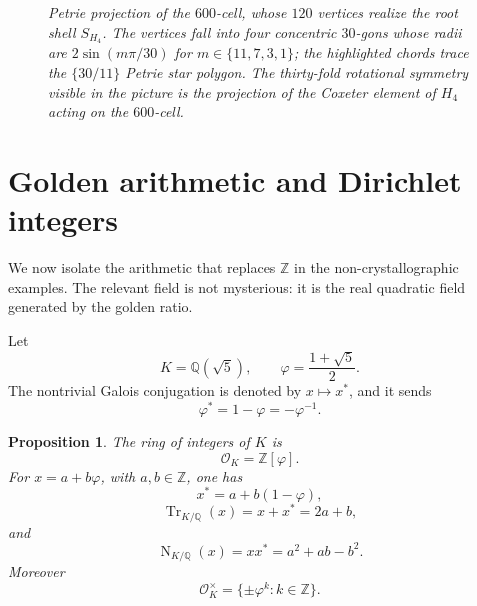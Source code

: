 \documentclass[12pt,oneside,english]{amsart}
\numberwithin{equation}{section}
\numberwithin{figure}{section}
\numberwithin{table}{section}
\theoremstyle{plain}
\newtheorem{proposition}[theorem]{Proposition}
\theoremstyle{definition}
\theoremstyle{remark}
\newcommand{\ZZ}{\mathbb Z}
\newcommand{\QQ}{\mathbb Q}
\newcommand{\KK}{\mathbb Q(\sqrt5)}
\newcommand{\Zphi}{\mathbb Z[\varphi]}
\newcommand{\Tr}{\operatorname{Tr}}
\newcommand{\Norm}{\operatorname{N}}
\begin{document}
\begin{figure}[htbp]
\caption{\emph{Petrie projection of the $600$-cell, whose $120$ vertices realize the root shell $S_{H_4}$. The vertices fall into four concentric $30$-gons whose radii are $2\sin(m\pi/30)$ for $m\in\{11,7,3,1\}$; the highlighted chords trace the $\{30/11\}$ Petrie star polygon. The thirty-fold rotational symmetry visible in the picture is the projection of the Coxeter element of $H_4$ acting on the $600$-cell.}}
\label{fig:600cell-petrie}
\end{figure}


\section{Golden arithmetic and Dirichlet integers}

We now isolate the arithmetic that replaces \(\ZZ\) in the non-crystallographic examples. The relevant field is not mysterious: it is the real quadratic field generated by the golden ratio.

Let
\begin{equation}
K=\KK,\qquad \varphi=\frac{1+\sqrt5}{2}.
\label{eq:golden-field}
\end{equation}
The nontrivial Galois conjugation is denoted by \(x\mapsto x^*\), and it sends
\begin{equation}
\varphi^*=1-\varphi=-\varphi^{-1}.
\label{eq:phi-conjugate}
\end{equation}

\begin{proposition}
The ring of integers of \(K\) is
\begin{equation}
\mathcal O_K=\Zphi.
\label{eq:ring-of-integers-golden}
\end{equation}
For \(x=a+b\varphi\), with \(a,b\in\ZZ\), one has
\begin{equation}
x^*=a+b(1-\varphi),
\label{eq:golden-conjugation}
\end{equation}
\begin{equation}
\Tr_{K/\QQ}(x)=x+x^*=2a+b,
\label{eq:golden-trace}
\end{equation}
and
\begin{equation}
\Norm_{K/\QQ}(x)=xx^*=a^2+ab-b^2.
\label{eq:golden-field-norm}
\end{equation}
Moreover
\begin{equation}
\mathcal O_K^\times=\{\pm\varphi^k:k\in\ZZ\}.
\label{eq:golden-units}
\end{equation}
\end{proposition}
\end{document}
